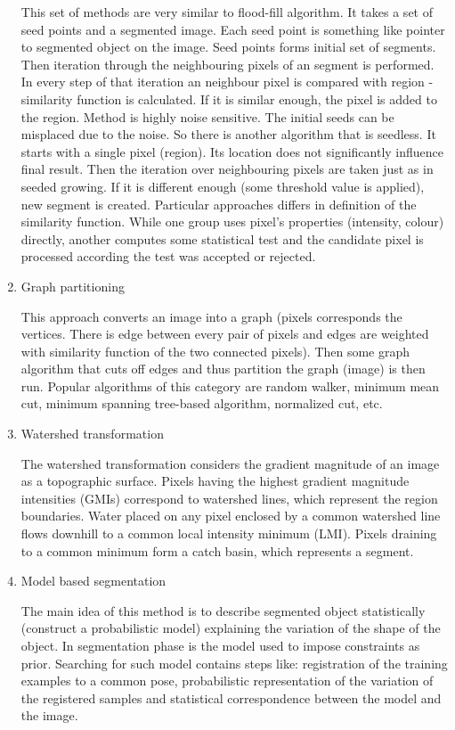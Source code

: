 \begin{enumerate}
  This set of methods are very similar to flood-fill algorithm.
It takes a set of seed points and a segmented image.
Each seed point is something like pointer to segmented object on the image.
Seed points forms initial set of segments.
Then iteration through the neighbouring pixels of an segment is performed.
In every step of that iteration an neighbour pixel is compared with region - similarity function is calculated.
If it is similar enough, the pixel is added to the region.
  Method is highly noise sensitive.
The initial seeds can be misplaced due to the noise.
So there is another algorithm that is seedless.
It starts with a single pixel (region).
Its location does not significantly influence final result.
Then the iteration over neighbouring pixels are taken just as in seeded growing.
If it is different enough (some threshold value is applied), new segment is created.
  Particular approaches differs in definition of the similarity function.
While one group uses pixel's properties (intensity, colour) directly, another computes some statistical test and the candidate pixel is processed according the test was accepted or rejected.

  \item Graph partitioning

  This approach converts an image into a graph (pixels corresponds the vertices.
There is edge between every pair of pixels and edges are weighted with similarity function of the two connected pixels).
Then some graph algorithm that cuts off edges and thus partition the graph (image) is then run.
Popular algorithms of this category are random walker, minimum mean cut, minimum spanning tree-based algorithm, normalized cut, etc.

  \item Watershed transformation

  The watershed transformation considers the gradient magnitude of an image as a topographic surface.
Pixels having the highest gradient magnitude intensities (GMIs) correspond to watershed lines, which represent the region boundaries.
Water placed on any pixel enclosed by a common watershed line flows downhill to a common local intensity minimum (LMI).
Pixels draining to a common minimum form a catch basin, which represents a segment.

  \item Model based segmentation

  The main idea of this method is to describe segmented object statistically (construct a probabilistic model) explaining the variation of the shape of the object.
In segmentation phase is the model used to impose constraints as prior.
Searching for such model contains steps like: registration of the training examples to a common pose, probabilistic representation of the variation of the registered samples and statistical correspondence between the model and the image.


\end{enumerate}
